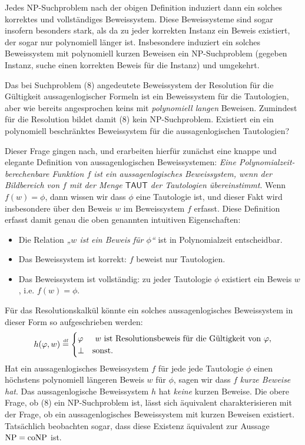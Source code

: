 Jedes NP-Suchproblem nach der obigen Definition induziert dann ein solches korrektes und vollständiges Beweissystem. Diese Beweissysteme sind sogar insofern besonders stark, als da zu jeder korrekten Instanz ein Beweis existiert, der sogar nur polynomiell länger ist.
Insbesondere induziert ein solches Beweissystem mit polynomiell kurzen Beweisen ein NP-Suchproblem (gegeben Instanz, suche einen korrekten Beweis für die Instanz) und umgekehrt.

Das bei Suchproblem (8) angedeutete Beweissystem der Resolution für die Gültigkeit aussagenlogischer Formeln ist ein Beweissystem für die Tautologien, aber wie bereits angesprochen keins mit \emph{polynomiell langen} Beweisen. Zumindest für die Resolution bildet damit (8) kein NP-Suchproblem. 
Existiert ein ein polynomiell beschränktes Beweissystem für die aussagenlogischen Tautologien?

Dieser Frage gingen \textcite{cook_relative_1979} nach, und erarbeiten hierfür zunächst eine knappe und elegante Definition von aussagenlogischen Beweissystemen: \emph{Eine Polynomialzeit-berechenbare Funktion $f$ ist ein \emph{aussagenlogisches Beweissystem}, wenn der Bildbereich von $f$ mit der Menge $\mathsf{TAUT}$ der Tautologien übereinstimmt}. Wenn $f(w)=\phi$, dann wissen wir dass $\phi$ eine Tautologie ist, und dieser Fakt wird insbesondere über den Beweis $w$ im Beweissystem $f$ erfasst. 
Diese Definition erfasst damit genau die oben genannten intuitiven Eigenschaften:
\begin{itemize}[noitemsep]
    \item Die Relation \emph{„$w$ ist ein Beweis für $\phi$“} ist in Polynomialzeit entscheidbar.
    \item Das Beweissystem ist korrekt: $f$ beweist nur Tautologien.
    \item Das Beweissystem ist vollständig: zu jeder Tautologie $\phi$ existiert ein Beweis $w$, i.e. $f(w)=\phi$.
\end{itemize}
Für das Resolutionskalkül könnte ein solches aussagenlogisches Beweissystem in dieser Form so aufgeschrieben werden:
\[ h(\varphi, w) \stackrel{\text{\smash{\tiny df}}}{=} \begin{cases} \varphi & \text{ $w$ ist Resolutionsbeweis für die Gültigkeit von $\varphi$},\\ \bot & \text{sonst}. \end{cases} \]
Hat ein aussagenlogisches Beweissystem $f$ für jede jede Tautologie $\phi$ einen höchstens polynomiell längeren Beweis $w$ für $\phi$, sagen wir dass $f$ \emph{kurze Beweise hat}. Das aussagenlogische Beweissystem $h$ hat \emph{keine} kurzen Beweise.
Die obere Frage, ob (8) ein NP-Suchproblem ist, lässt sich äquivalent charakterisieren mit der Frage, ob ein aussagenlogisches Beweissystem mit kurzen Beweisen existiert.
Tatsächlich beobachten \citeauthor{cook_relative_1979} sogar, dass diese Existenz äquivalent zur Aussage $\mathrm{NP}=\mathrm{coNP}$ ist.

